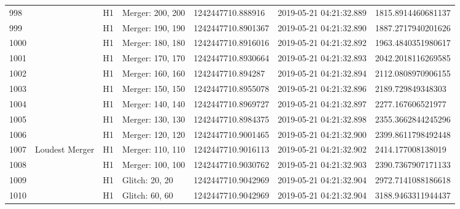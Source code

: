 \begin{longtable}{lllllll}
998  &                                                    &       H1 &  Merger: 200, 200 &   1242447710.888916 &  2019-05-21 04:21:32.889 &  1815.8914460681137 \\
999  &                                                    &       H1 &  Merger: 190, 190 &  1242447710.8901367 &  2019-05-21 04:21:32.890 &  1887.2717940201626 \\
1000 &                                                    &       H1 &  Merger: 180, 180 &  1242447710.8916016 &  2019-05-21 04:21:32.892 &  1963.4840351980617 \\
1001 &                                                    &       H1 &  Merger: 170, 170 &  1242447710.8930664 &  2019-05-21 04:21:32.893 &  2042.2018116269585 \\
1002 &                                                    &       H1 &  Merger: 160, 160 &   1242447710.894287 &  2019-05-21 04:21:32.894 &  2112.0808970906155 \\
1003 &                                                    &       H1 &  Merger: 150, 150 &  1242447710.8955078 &  2019-05-21 04:21:32.896 &   2189.729849348303 \\
1004 &                                                    &       H1 &  Merger: 140, 140 &  1242447710.8969727 &  2019-05-21 04:21:32.897 &   2277.167606521977 \\
1005 &                                                    &       H1 &  Merger: 130, 130 &  1242447710.8984375 &  2019-05-21 04:21:32.898 &  2355.3662844245296 \\
1006 &                                                    &       H1 &  Merger: 120, 120 &  1242447710.9001465 &  2019-05-21 04:21:32.900 &  2399.8611798492448 \\
1007 &                                     Loudest Merger &       H1 &  Merger: 110, 110 &  1242447710.9016113 &  2019-05-21 04:21:32.902 &   2414.177008138019 \\
1008 &                                                    &       H1 &  Merger: 100, 100 &  1242447710.9030762 &  2019-05-21 04:21:32.903 &  2390.7367907171133 \\
1009 &                                                    &       H1 &    Glitch: 20, 20 &  1242447710.9042969 &  2019-05-21 04:21:32.904 &  2972.7141088186618 \\
1010 &                                                    &       H1 &    Glitch: 60, 60 &  1242447710.9042969 &  2019-05-21 04:21:32.904 &  3188.9463311944437 \\

\end{longtable}
